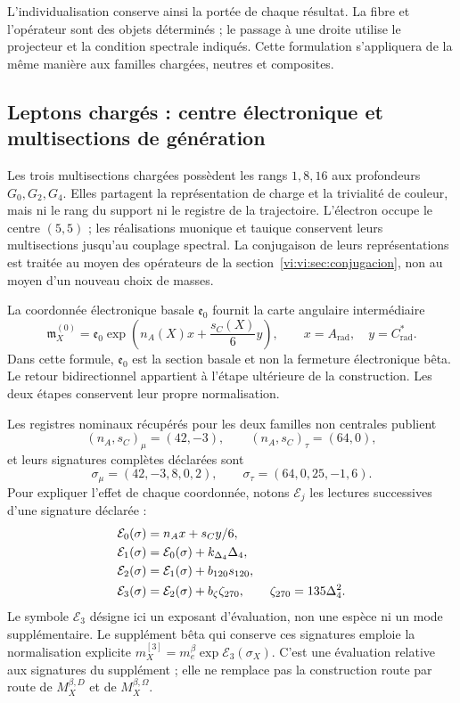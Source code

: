 L'individualisation conserve ainsi la portée de chaque résultat. La fibre
et l'opérateur sont des objets déterminés ; le passage à une droite utilise le
projecteur et la condition spectrale indiqués. Cette formulation s'appliquera
de la même manière aux familles chargées, neutres et composites.

\subsection{Leptons chargés : centre électronique et multisections de génération}
\label{vi:vi:subsec:leptones-cargados}

Les trois multisections chargées possèdent les rangs \(1,8,16\) aux profondeurs
\(G_0,G_2,G_4\). Elles partagent la représentation de charge et la trivialité
de couleur, mais ni le rang du support ni le registre de la trajectoire.
L’électron occupe le centre \((5,5)\) ; les réalisations muonique et
tauique conservent leurs multisections jusqu’au couplage
spectral. La conjugaison de leurs représentations est traitée au moyen des
opérateurs de la section~\ref{vi:vi:sec:conjugacion}, non au moyen d’un nouveau
choix de masses.

La coordonnée électronique basale \(\mathfrak e_0\) fournit la carte
angulaire intermédiaire
\begin{equation}
 \mathfrak m_X^{(0)}=\mathfrak e_0
 \exp\left(n_A(X)x+\frac{s_C(X)}6y\right),
 \qquad x=A_{\mathrm{rad}},\quad y=C^*_{\mathrm{rad}}.
 \label{vi:vi:eq:carta-angular-familias}
\end{equation}
Dans cette formule, \(\mathfrak e_0\) est la section basale et non la fermeture
électronique bêta. Le retour bidirectionnel appartient à l’étape ultérieure
de la construction. Les deux étapes conservent leur propre normalisation.

Les registres nominaux récupérés pour les deux familles non centrales
publient
\[
 (n_A,s_C)_\mu=(42,-3),\qquad (n_A,s_C)_\tau=(64,0),
\]
et leurs signatures complètes déclarées sont
\begin{equation}
 \sigma_\mu=(42,-3,8,0,2),\qquad
 \sigma_\tau=(64,0,25,-1,6).
 \label{vi:vi:eq:firmas-muon-tau}
\end{equation}
Pour expliquer l’effet de chaque coordonnée, notons \(\mathcal E_j\)
les lectures successives d’une signature déclarée :
\begin{align}
 \mathcal E_0(\sigma)&=n_Ax+s_Cy/6,\notag\\
 \mathcal E_1(\sigma)&=\mathcal E_0(\sigma)+k_{\Delta_4}\Delta_4,\notag\\
 \mathcal E_2(\sigma)&=\mathcal E_1(\sigma)+b_{120}s_{120},\notag\\
 \mathcal E_3(\sigma)&=\mathcal E_2(\sigma)+b_\zeta\zeta_{270},
 \qquad\zeta_{270}=135\Delta_4^2.
 \label{vi:vi:eq:etapas-e3-sectoriales}
\end{align}
Le symbole \(\mathcal E_3\) désigne ici un exposant d’évaluation,
non une espèce ni un mode supplémentaire. Le supplément bêta qui conserve ces
signatures emploie la normalisation explicite
\(m_X^{[3]}=m_e^\beta\exp\mathcal E_3(\sigma_X)\).
C’est une évaluation relative aux signatures du supplément ; elle ne remplace pas
la construction route par route de \(M_X^{\beta,D}\) et de
\(M_X^{\beta,\Omega}\).

